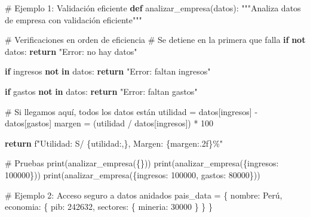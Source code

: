 \documentclass[
  doc,
  floatsintext,
  longtable,
  a4paper,
  nolmodern,
  notxfonts,
  notimes,
  12pt,
  colorlinks=true,linkcolor=blue,citecolor=blue,urlcolor=blue]{apa7}
\newenvironment{Shaded}{\begin{snugshade}}{\end{snugshade}}
\newcommand{\BuiltInTok}[1]{\textcolor[rgb]{0.00,0.23,0.31}{#1}}
\newcommand{\CommentTok}[1]{\textcolor[rgb]{0.37,0.37,0.37}{#1}}
\newcommand{\ControlFlowTok}[1]{\textcolor[rgb]{0.00,0.23,0.31}{\textbf{#1}}}
\newcommand{\DecValTok}[1]{\textcolor[rgb]{0.68,0.00,0.00}{#1}}
\newcommand{\KeywordTok}[1]{\textcolor[rgb]{0.00,0.23,0.31}{\textbf{#1}}}
\newcommand{\NormalTok}[1]{\textcolor[rgb]{0.00,0.23,0.31}{#1}}
\newcommand{\OperatorTok}[1]{\textcolor[rgb]{0.37,0.37,0.37}{#1}}
\newcommand{\SpecialCharTok}[1]{\textcolor[rgb]{0.37,0.37,0.37}{#1}}
\newcommand{\SpecialStringTok}[1]{\textcolor[rgb]{0.13,0.47,0.30}{#1}}
\newcommand{\StringTok}[1]{\textcolor[rgb]{0.13,0.47,0.30}{#1}}
\begin{document}
\begin{Shaded}
\begin{Highlighting}[]
\CommentTok{\# Ejemplo 1: Validación eficiente}
\KeywordTok{def}\NormalTok{ analizar\_empresa(datos):}
    \CommentTok{"""Analiza datos de empresa con validación eficiente"""}
    
    \CommentTok{\# Verificaciones en orden de eficiencia}
    \CommentTok{\# Se detiene en la primera que falla}
    \ControlFlowTok{if} \KeywordTok{not}\NormalTok{ datos:}
        \ControlFlowTok{return} \StringTok{"Error: no hay datos"}
    
    \ControlFlowTok{if} \StringTok{\textquotesingle{}ingresos\textquotesingle{}} \KeywordTok{not} \KeywordTok{in}\NormalTok{ datos:}
        \ControlFlowTok{return} \StringTok{"Error: faltan ingresos"}
    
    \ControlFlowTok{if} \StringTok{\textquotesingle{}gastos\textquotesingle{}} \KeywordTok{not} \KeywordTok{in}\NormalTok{ datos:}
        \ControlFlowTok{return} \StringTok{"Error: faltan gastos"}
    
    \CommentTok{\# Si llegamos aquí, todos los datos están}
\NormalTok{    utilidad }\OperatorTok{=}\NormalTok{ datos[}\StringTok{\textquotesingle{}ingresos\textquotesingle{}}\NormalTok{] }\OperatorTok{{-}}\NormalTok{ datos[}\StringTok{\textquotesingle{}gastos\textquotesingle{}}\NormalTok{]}
\NormalTok{    margen }\OperatorTok{=}\NormalTok{ (utilidad }\OperatorTok{/}\NormalTok{ datos[}\StringTok{\textquotesingle{}ingresos\textquotesingle{}}\NormalTok{]) }\OperatorTok{*} \DecValTok{100}
    
    \ControlFlowTok{return} \SpecialStringTok{f"Utilidad: S/ }\SpecialCharTok{\{}\NormalTok{utilidad}\SpecialCharTok{:,\}}\SpecialStringTok{, Margen: }\SpecialCharTok{\{}\NormalTok{margen}\SpecialCharTok{:.2f\}}\SpecialStringTok{\%"}

\CommentTok{\# Pruebas}
\BuiltInTok{print}\NormalTok{(analizar\_empresa(\{\}))}
\BuiltInTok{print}\NormalTok{(analizar\_empresa(\{}\StringTok{\textquotesingle{}ingresos\textquotesingle{}}\NormalTok{: }\DecValTok{100000}\NormalTok{\}))}
\BuiltInTok{print}\NormalTok{(analizar\_empresa(\{}\StringTok{\textquotesingle{}ingresos\textquotesingle{}}\NormalTok{: }\DecValTok{100000}\NormalTok{, }\StringTok{\textquotesingle{}gastos\textquotesingle{}}\NormalTok{: }\DecValTok{80000}\NormalTok{\}))}

\CommentTok{\# Ejemplo 2: Acceso seguro a datos anidados}
\NormalTok{pais\_data }\OperatorTok{=}\NormalTok{ \{}
    \StringTok{\textquotesingle{}nombre\textquotesingle{}}\NormalTok{: }\StringTok{\textquotesingle{}Perú\textquotesingle{}}\NormalTok{,}
    \StringTok{\textquotesingle{}economia\textquotesingle{}}\NormalTok{: \{}
        \StringTok{\textquotesingle{}pib\textquotesingle{}}\NormalTok{: }\DecValTok{242632}\NormalTok{,}
        \StringTok{\textquotesingle{}sectores\textquotesingle{}}\NormalTok{: \{}
            \StringTok{\textquotesingle{}mineria\textquotesingle{}}\NormalTok{: }\DecValTok{30000}
\NormalTok{        \}}
\NormalTok{    \}}
\NormalTok{\}}


\end{Highlighting}
\end{Shaded}
\end{document}
